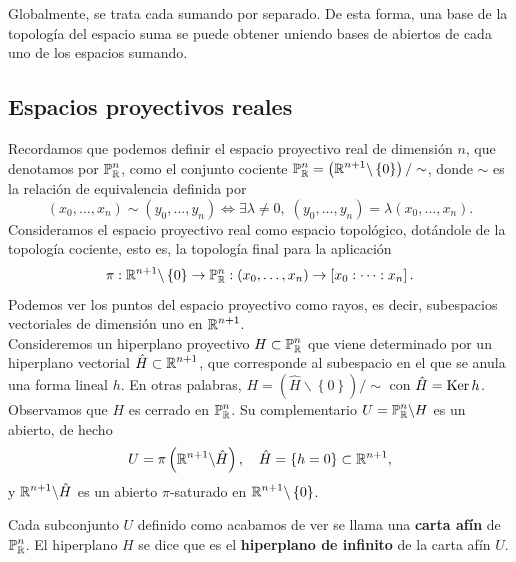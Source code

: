 Globalmente, se trata cada sumando por separado. De esta forma, una base de la topología del espacio suma se puede obtener uniendo bases de abiertos de cada uno de los espacios sumando. 
\subsection{Espacios proyectivos reales}
Recordamos que podemos definir el espacio proyectivo real de dimensión $\displaystyle n $, que denotamos por $\displaystyle \mathbb{P}^{n}_{\mathbb{R}} $, como el conjunto cociente $\displaystyle \mathbb{P}^{n}_{\mathbb{R}} = \left(\mathbb{R}^{n+1}\backslash \left\{ 0\right\} \right)/ \sim $, donde $\displaystyle \sim  $ es la relación de equivalencia definida por
\[\left(x_{0}, \ldots, x_{n}\right)\sim \left(y_{0}, \ldots, y_{n}\right)\iff \exists\lambda\neq 0, \; \left(y_{0}, \ldots, y_{n}\right)=\lambda\left(x_{0}, \ldots, x_{n}\right) .\]
Consideramos el espacio proyectivo real como espacio topológico, dotándole de la topología cociente, esto es, la topología final para la aplicación
\[\pi : \mathbb{R}^{n+1} \backslash \left\{ 0\right\} \to \mathbb{P}^{n}_{\mathbb{R}} : \left(x_{0}, \ldots, x_{n}\right) \to \left[x_{0} : \cdots : x_{n}\right]  .\]
Podemos ver los puntos del espacio proyectivo como rayos, es decir, subespacios vectoriales de dimensión uno en $\displaystyle \mathbb{R}^{n+1} $. \\
Consideremos un hiperplano proyectivo $\displaystyle H \subset \mathbb{P}^{n}_{\mathbb{R}} $ que viene determinado por un hiperplano vectorial $\displaystyle \hat{H}\subset \mathbb{R}^{n+1} $, que corresponde al subespacio en el que se anula una forma lineal $\displaystyle h $. En otras palabras, $\displaystyle H = \left(\hat{H} \backslash \left\{ 0\right\} \right)/ \sim $ con $\displaystyle \hat{H}=\operatorname{Ker} h $. Observamos que $\displaystyle H $ es cerrado en $\displaystyle \mathbb{P}^{n}_{\mathbb{R}} $. Su complementario $\displaystyle U = \mathbb{P}^{n}_{\mathbb{R}} \backslash  H $ es un abierto, de hecho
\[U = \pi\left(\mathbb{R}^{n+1} \backslash \hat{H}\right), \quad \hat{H} = \left\{ h = 0\right\} \subset \mathbb{R}^{n+1} ,\]
y $\displaystyle \mathbb{R}^{n+1} \backslash \hat{H} $ es un abierto $\displaystyle \pi  $-saturado en $\displaystyle \mathbb{R}^{n+1} \backslash \left\{ 0\right\}  $. 
\begin{definition}
Cada subconjunto $\displaystyle U $ definido como acabamos de ver se llama una \textbf{carta afín} de $\displaystyle \mathbb{P}^{n}_{\mathbb{R}} $. El hiperplano $\displaystyle H $ se dice que es el \textbf{hiperplano de infinito} de la carta afín $\displaystyle U $.
\end{definition}
